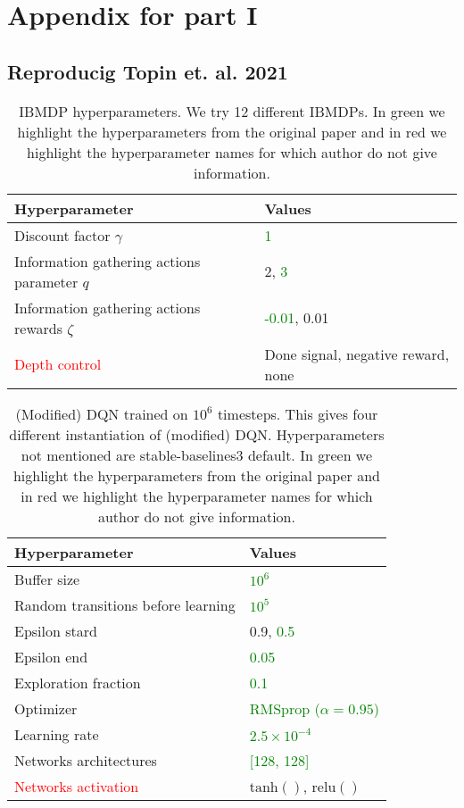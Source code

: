 \chapter{Appendix for part I}
\label{chap-app-pomdp}
\section{Reproducig Topin et. al. 2021}

\begin{table}
    \centering
    \caption{IBMDP hyperparameters. We try 12 different IBMDPs. In green we highlight the hyperparameters from the original paper and in red we highlight the hyperparameter names for which author do not give information.}\label{tab:ibmdp-params}
    \begin{tabular}{ll}
    \toprule
    \textbf{Hyperparameter} & \textbf{Values}\\
    \midrule
    Discount factor $\gamma$ & \textcolor{green}{1} \\
    Information gathering actions parameter $q$ & 2, \textcolor{green}{3} \\
    Information gathering actions rewards $\zeta$ & \textcolor{green}{-0.01}, 0.01 \\
    \textcolor{red}{Depth control} & Done signal, negative reward, none \\ 
    \bottomrule
    \end{tabular}
    \end{table}

\begin{table}
    \centering
    \caption{(Modified) DQN trained on $10^6$ timesteps. This gives four different instantiation of (modified) DQN. Hyperparameters not mentioned are stable-baselines3 default. In green we highlight the hyperparameters from the original paper and in red we highlight the hyperparameter names for which author do not give information.}\label{tab:ibmdp-rl1}
    \begin{tabular}{ll}
    \toprule
    \textbf{Hyperparameter} & \textbf{Values}\\
    \midrule
    Buffer size & \textcolor{green}{$10^6$} \\
    Random transitions before learning & \textcolor{green}{$10^5$} \\
    Epsilon stard & 0.9, \textcolor{green}{0.5} \\
    Epsilon end & \textcolor{green}{0.05} \\
    Exploration fraction & \textcolor{green}{0.1} \\
    Optimizer & \textcolor{green}{RMSprop ($\alpha = 0.95$)}\\
    Learning rate & \textcolor{green}{$2.5\times10^{-4}$}\\
    Networks architectures & \textcolor{green}{[128, 128]}\\
    \textcolor{red}{Networks activation} & $\operatorname{tanh()}$, $\operatorname{relu()}$\\
    \bottomrule
    \end{tabular}
    \end{table}

